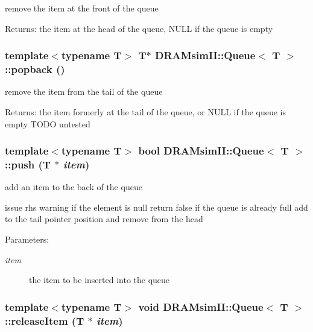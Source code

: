 remove the item at the front of the queue 

\begin{Desc}
\item[Returns:]the item at the head of the queue, NULL if the queue is empty \end{Desc}
\subsubsection[{popback}]{\setlength{\rightskip}{0pt plus 5cm}template$<$typename T$>$ T$\ast$ {\bf DRAMsimII::Queue}$<$ T $>$::popback ()\hspace{0.3cm}{\tt  [inline]}}\label{class_d_r_a_msim_i_i_1_1_queue_33d70a6d9462359c8539401ad45b4c3f}


remove the item from the tail of the queue 

\begin{Desc}
\item[Returns:]the item formerly at the tail of the queue, or NULL if the queue is empty TODO untested \end{Desc}
\subsubsection[{push}]{\setlength{\rightskip}{0pt plus 5cm}template$<$typename T$>$ bool {\bf DRAMsimII::Queue}$<$ T $>$::push (T $\ast$ {\em item})\hspace{0.3cm}{\tt  [inline]}}\label{class_d_r_a_msim_i_i_1_1_queue_617e50de4a77b5bc1e7ec3368bb132ac}


add an item to the back of the queue 

issue rhs warning if the element is null return false if the queue is already full add to the tail pointer position and remove from the head \begin{Desc}
\item[Parameters:]
\begin{description}
\item[{\em item}]the item to be inserted into the queue \end{description}
\end{Desc}
\subsubsection[{releaseItem}]{\setlength{\rightskip}{0pt plus 5cm}template$<$typename T$>$ void {\bf DRAMsimII::Queue}$<$ T $>$::releaseItem (T $\ast$ {\em item})\hspace{0.3cm}{\tt  [inline]}}\label{class_d_r_a_msim_i_i_1_1_queue_b9035bfc5f1a6db6ab697a5058642f38}


